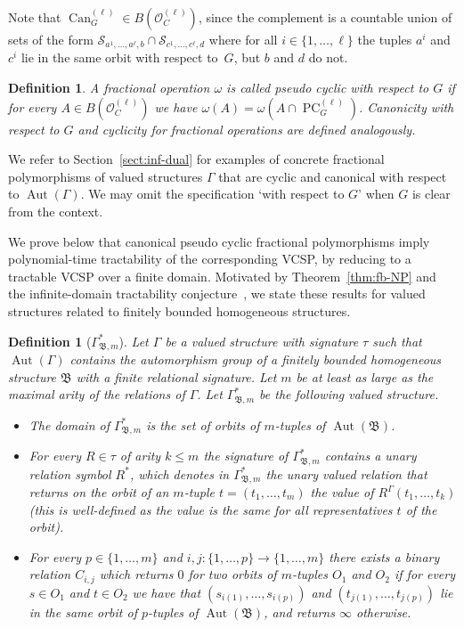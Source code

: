 \documentclass[nonacm]{acmart}
\newcommand{\bB}{{\mathfrak B}}
\DeclareMathOperator{\Can}{Can}
\DeclareMathOperator{\PC}{PC}
\DeclareMathOperator{\Aut}{Aut}
\newtheorem{definition}[theorem]{Definition}
\begin{document}
Note that $\Can_G^{(\ell)} \in B({\mathscr O}^{(\ell)}_C)$, since the complement is a countable union of sets of the form ${\mathscr S}_{a^1,\dots,a^{\ell},b} \cap {\mathscr S}_{c^1,\dots,c^{\ell},d}$ where for all $i \in \{1,\dots,\ell\}$ the tuples $a^i$ and $c^i$ lie in the same orbit with respect to~$G$, but $b$ and $d$ do not.



\begin{definition}
A fractional operation $\omega$ is called \emph{pseudo cyclic with respect to $G$} if for every 
$A \in B({\mathscr O}_C^{(\ell)})$ we have $\omega(A) = \omega(A \cap \PC^{(\ell)}_{G})$.
Canonicity with respect to $G$ and cyclicity for fractional operations
are defined analogously.
\end{definition}


We refer to Section~\ref{sect:inf-dual} 
for examples of concrete fractional polymorphisms of valued structures $\Gamma$ that are cyclic and canonical with respect to $\Aut(\Gamma)$. 
We may omit the specification 
`with respect to $G$' when $G$ is clear from the context. 


We  prove below that 
canonical pseudo cyclic fractional polymorphisms imply polynomial-time tractability of the corresponding VCSP, by reducing to a tractable VCSP over a finite domain. Motivated by Theorem~\ref{thm:fb-NP} and the infinite-domain tractability conjecture~\cite[Conjecture 1.2]{BPP-projective-homomorphisms}, we state these results
for valued structures related to finitely bounded homogeneous structures.

\begin{definition}[$\Gamma^*_{\bB,m}$]\label{def:typetemplate}
Let $\Gamma$ be a valued structure with signature $\tau$ such that $\Aut(\Gamma)$ contains the automorphism group of a finitely bounded homogeneous structure $\bB$ with a finite relational signature.
Let $m$ be at least as large as the maximal arity of the relations of $\Gamma$.
Let $\Gamma^*_{\bB,m}$ be the following valued structure.
\begin{itemize}
\item The domain of $\Gamma^*_{\bB,m}$ is the set
of orbits of $m$-tuples of $\Aut(\bB)$. 
\item For every $R \in \tau$ of arity $k \leq m$ 
the signature of $\Gamma_{\bB,m}^*$ contains a unary relation symbol $R^*$, which denotes 
in $\Gamma_{\bB,m}^*$ the unary valued relation that returns on the orbit of an $m$-tuple $t=(t_1, \dots, t_m)$ the value of  
$R^{\Gamma}(t_1,\dots,t_k)$ (this is well-defined as the value is the same for all representatives $t$ of the orbit). 
\item For every $p \in \{1,\dots,m\}$ 
and $i,j \colon \{1,\dots,p\} \to \{1,\dots,m\}$ there exists a binary relation $C_{i,j}$ which returns $0$ for two orbits of $m$-tuples $O_1$ and $O_2$ if 
for every $s \in O_1$ and $t \in O_2$ we have that 
$(s_{i(1)},\dots,s_{i(p)})$
and $(t_{j(1)},\dots,t_{j(p)})$ 
 lie in the same orbit of $p$-tuples of $\Aut(\bB)$, and returns $\infty$ otherwise.
 \end{itemize}
\end{definition}
\end{document}

